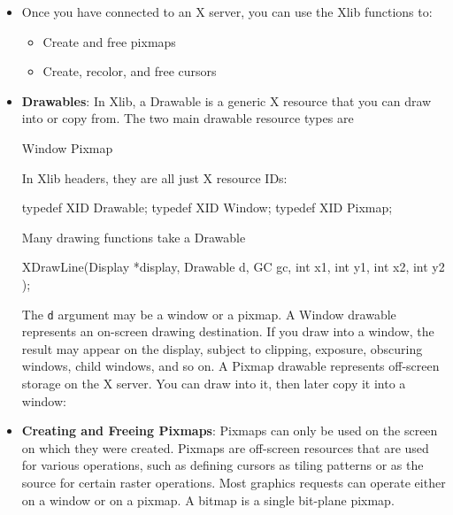 \documentclass{report}
\begin{document}
    \pagebreak 
    \begin{itemize}
        \item Once you have connected to an X server, you can use the Xlib functions to:
            \begin{itemize}
                \item Create and free pixmaps
                \item Create, recolor, and free cursors
            \end{itemize}
        \item \textbf{Drawables}: In Xlib, a Drawable is a generic X resource that you can draw into or copy from.
            \bigbreak \noindent 
            The two main drawable resource types are
            \bigbreak \noindent 
            \begin{cppcode}
            Window 
            Pixmap
            \end{cppcode}
            \bigbreak \noindent 
            In Xlib headers, they are all just X resource IDs:
            \bigbreak \noindent 
            \begin{cppcode}
                typedef XID Drawable;
                typedef XID Window;
                typedef XID Pixmap;
            \end{cppcode}
            Many drawing functions take a Drawable
            \bigbreak \noindent 
            \begin{cppcode}
                XDrawLine(Display *display,
                    Drawable d,
                    GC gc,
                    int x1, int y1,
                    int x2, int y2
                );
            \end{cppcode}
            \bigbreak \noindent 
            The \texttt{d} argument may be a window or a pixmap. A Window drawable represents an on-screen drawing destination. If you draw into a window, the result may appear on the display, subject to clipping, exposure, obscuring windows, child windows, and so on.
            \bigbreak \noindent 
            A Pixmap drawable represents off-screen storage on the X server. You can draw into it, then later copy it into a window:
        \item \textbf{Creating and Freeing Pixmaps}: Pixmaps can only be used on the screen on which they were created. Pixmaps are off-screen resources that are used for various operations, such as defining cursors as tiling patterns or as the source for certain raster operations. Most graphics requests can operate either on a window or on a pixmap. A bitmap is a single bit-plane pixmap.

\end{itemize}
\end{document}
